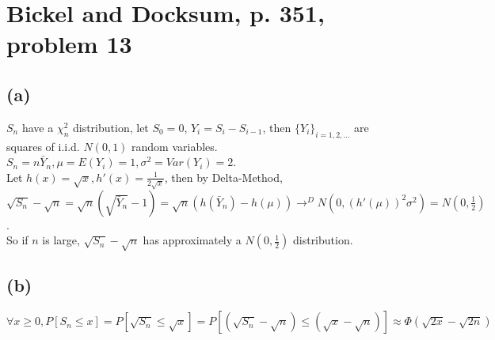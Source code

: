 \def\thecourse{18.466}
\def\thestudent{Zhilei Xu (929552018)}
\def\theprob{6}


\section{Bickel and Docksum, p. 351, problem 13}
\subsection*{(a)}
$S_n$ have a $\chi_n^2$ distribution,
let $S_0 = 0$, $Y_i = S_i - S_{i-1}$,
then $\{Y_i\}_{i=1,2,\dots}$ are squares of i.i.d. $N(0,1)$ random variables.
$S_n = n\bar{Y}_n, \mu = E(Y_i) = 1,
\sigma^2 = Var(Y_i) = 2$.
\\
Let $h(x) = \sqrt{x}, h'(x) = \frac{1}{2\sqrt{x}}$,
then by Delta-Method,\\
$\sqrt{S_n} - \sqrt{n} =
\sqrt{n}(\sqrt{\bar{Y}_n} - 1) =
\sqrt{n}(h(\bar{Y}_n) - h(\mu))
\to^{D} N(0, (h'(\mu))^2\sigma^2) = N(0, \frac{1}{2})
$.\\
So if $n$ is large, $\sqrt{S_n} - \sqrt{n}$ has approximately a $N(0, \frac{1}{2})$ distribution.

\subsection*{(b)}
$
\forall x \geq 0,
P[S_n \leq x] = P[\sqrt{S_n} \leq \sqrt{x}] =
P[(\sqrt{S_n}-\sqrt{n}) \leq (\sqrt{x} - \sqrt{n})] \approx
\Phi(\sqrt{2x} - \sqrt{2n})
$

